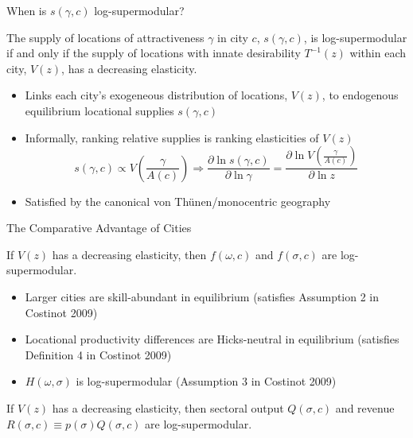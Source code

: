 \documentclass[10pt,notes=hide]{beamer}
\begin{document}
\begin{frame}{When is $s(\gamma,c)$ log-supermodular?}
\begin{proposition}
\label{prop:LocationDistribution}The supply of locations of attractiveness
$\gamma$ in city $c$, $s(\gamma,c)$, is log-supermodular if and
only if the supply of locations with innate desirability \textrm{\textup{$T^{-1}(z)$}}
within each city, $V(z)$, has a decreasing elasticity.\end{proposition}
\begin{itemize}
\item Links each city's exogeneous distribution of locations, $V(z)$, to
endogenous equilibrium locational supplies $s(\gamma,c)$
\item Informally, ranking relative supplies is ranking elasticities of $V(z)$
\[
s(\gamma,c)\propto V\left(\frac{\gamma}{A(c)}\right)\Rightarrow\frac{\partial\ln s(\gamma,c)}{\partial\ln\gamma}=\frac{\partial\ln V\left(\frac{\gamma}{A(c)}\right)}{\partial\ln z}
\]

\item Satisfied by the canonical von Th\"{u}nen/monocentric geography
\end{itemize}

\end{frame}


\begin{frame}{The Comparative Advantage of Cities}
\begin{corollary}
\label{cor:Skills-and-Sectors}If $V(z)$ has a decreasing elasticity,
then $f(\omega,c)$ and $f(\sigma,c)$ are log-supermodular.
\end{corollary}
\pause
\begin{itemize}
\item {\small{}Larger cities are skill-abundant in equilibrium (satisfies
Assumption 2 in Costinot 2009)}{\small \par}
\item {\small{}Locational productivity differences are Hicks-neutral in
equilibrium (satisfies Definition 4 in Costinot 2009)}{\small \par}
\item {\small{}$H(\omega,\sigma)$ is log-supermodular (Assumption 3 in
Costinot 2009)}{\small \par}\end{itemize}
\begin{corollary}
\label{Cor:Outputs-and-Revenues}If $V(z)$ has a decreasing elasticity,
then sectoral output $Q(\sigma,c)$ and revenue $R(\sigma,c)\equiv p(\sigma)Q(\sigma,c)$
are log-supermodular.
\end{corollary}

\end{frame}
\end{document}
